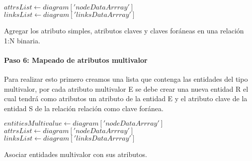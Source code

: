 \begin{algorithm}[H]

    $attrsList \gets diagram['nodeDataArrray']$
    $linksList \gets diagram['linksDataArrray']$
  \caption{Agregar los atributo simples, atributos claves y claves foráneas  en una relación 1:N binaria.}
\end{algorithm}

\paragraph*{Paso 6: Mapeado de atributos multivalor}

Para realizar esto primero creamos una lista que contenga las entidades del tipo multivalor, por cada atributo multivalor E se debe crear una nueva entidad R el cual tendrá como atributos un atributo de la entidad E y el atributo clave de la entidad S de la relación relación como clave foránea.

\begin{algorithm}[H]

  $entitiesMultivalue \gets diagram['nodeDataArrray']$\\
  $attrsList \gets diagram['nodeDataArrray']$\\
  $linksList \gets diagram['linksDataArrray']$\\
   {
  }
  \caption{Asociar entidades multivalor con sus atributos.}
\end{algorithm}

